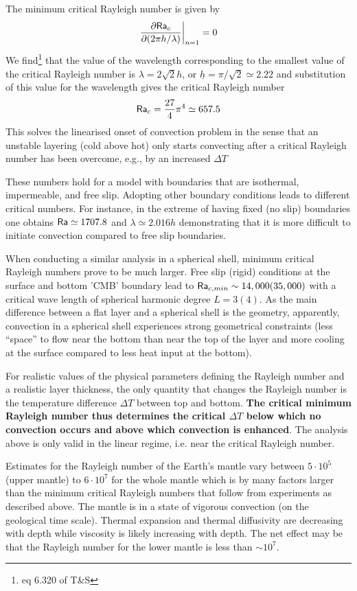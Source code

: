 The minimum critical Rayleigh number is given by 
\[
\left. \frac{\partial {\mathsf{Ra}}_c}{\partial (2\pi h /\lambda)}\right|_{n=1}=0
\]
We find\footnote{eq 6.320 of T\&S} that the value of the wavelength corresponding 
to the smallest value of the critical Rayleigh number is $\lambda = 2\sqrt{2} h$, or 
$\underline{h} = \pi/\sqrt{2} \simeq 2.22$ and substitution of this value for the wavelength gives the critical Rayleigh number 
\[
{\mathsf{Ra}}_c = \frac{27}{4}\pi^4 \simeq 657.5
\]
This solves the linearised onset of convection problem in the sense that an
unstable layering (cold above hot) only starts convecting after a critical
Rayleigh number has been overcome, e.g., by an increased $\Delta T$

These numbers hold for a model with boundaries that are
isothermal, impermeable, and free slip. Adopting other boundary conditions leads to
different critical numbers. For instance, in the extreme of having fixed (no slip) boundaries one
obtains ${\mathsf{Ra}} \simeq 1707.8$ and $\lambda \simeq 2.016 h$ demonstrating that it is more difficult to initiate convection compared to free slip boundaries.

When conducting a similar analysis in a spherical shell, minimum critical Rayleigh
numbers prove to be much larger. Free slip (rigid) conditions at the surface and bottom
'CMB' boundary lead to ${\mathsf{Ra}}_{c,min}\sim 14,000 (35,000)$ with a critical wave length of
spherical harmonic degree $L=3 (4)$. As the main difference between a flat layer and a
spherical shell is the geometry, apparently, convection in a spherical shell experiences
strong geometrical constraints (less “space” to flow near the bottom than near the top of
the layer and more cooling at the surface compared to less heat input at the bottom).

For realistic values of the physical parameters defining the Rayleigh number and a
realistic layer thickness, the only quantity that changes the Rayleigh number is the
temperature difference $\Delta T$ between top and bottom. {\bf The critical minimum Rayleigh number thus determines the critical $\Delta T$ below which no convection occurs and above which convection is enhanced}. The analysis above is only valid in the linear regime, i.e. near the critical Rayleigh number. 

Estimates for the Rayleigh number of the Earth's mantle vary between $5\cdot 10^5$ (upper
mantle) to $6\cdot 10^7$ for the whole mantle which is by many factors larger than the minimum
critical Rayleigh numbers that follow from experiments as described above. The mantle
is in a state of vigorous convection (on the geological time scale). Thermal expansion and
thermal diffusivity are decreasing with depth while viscosity is likely increasing with
depth. The net effect may be that the Rayleigh number for the lower mantle is less than $\sim 10^7$.

